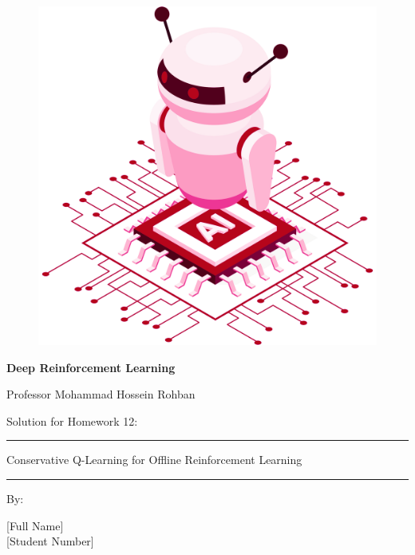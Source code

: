 \documentclass[12pt]{article}
\begin{document}
\thispagestyle{plain}

\begin{center}

\vspace*{-1.5cm}
\begin{figure}[!h]
    \centering
    \includegraphics[width=0.7\linewidth]{figs/cover-std.png}
\end{figure}

{

{\color{DarkBlue} {\fontsize{30}{50} \textbf{
Deep Reinforcement Learning
}}}

{\color{DarkBlue} {\Large
Professor Mohammad Hossein Rohban
}}
}


\vspace{20pt}

{


{\color{RedOrange}
{\Large
Solution for Homework 12:
}\\
}
{\color{BrickRed}
\rule{12cm}{0.5pt}

{\Huge

Conservative Q-Learning for Offline Reinforcement Learning

}
\rule{12cm}{0.5pt}
}

\vspace{10pt}

{\color{RoyalPurple} { \small By:} } \\
\vspace{10pt}

{\color{Blue} { \LARGE [Full Name] } } \\
\vspace{5pt}
{\color{RoyalBlue} { \Large [Student Number] } }


}
\end{center}
\end{document}
